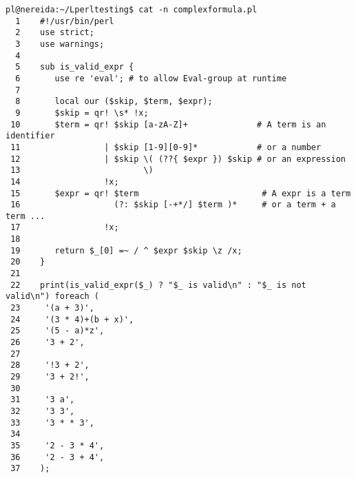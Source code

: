 \begin{latexonly}
\begin{verbatim}
pl@nereida:~/Lperltesting$ cat -n complexformula.pl
  1    #!/usr/bin/perl
  2    use strict;
  3    use warnings;
  4  
  5    sub is_valid_expr {
  6       use re 'eval'; # to allow Eval-group at runtime
  7  
  8       local our ($skip, $term, $expr);
  9       $skip = qr! \s* !x;
 10       $term = qr! $skip [a-zA-Z]+              # A term is an identifier
 11                 | $skip [1-9][0-9]*            # or a number
 12                 | $skip \( (??{ $expr }) $skip # or an expression
 13                         \)
 14                 !x;
 15       $expr = qr! $term                         # A expr is a term
 16                   (?: $skip [-+*/] $term )*     # or a term + a term ...
 17                 !x;
 18  
 19       return $_[0] =~ / ^ $expr $skip \z /x;
 20    }
 21  
 22    print(is_valid_expr($_) ? "$_ is valid\n" : "$_ is not valid\n") foreach (
 23     '(a + 3)',
 24     '(3 * 4)+(b + x)',
 25     '(5 - a)*z',
 26     '3 + 2',
 27  
 28     '!3 + 2',
 29     '3 + 2!',
 30  
 31     '3 a',
 32     '3 3',
 33     '3 * * 3',
 34  
 35     '2 - 3 * 4',
 36     '2 - 3 + 4',
 37    );
\end{verbatim}
\end{latexonly}
